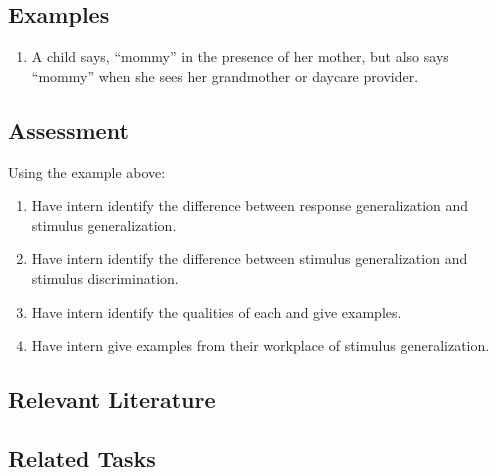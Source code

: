 \subsection{Examples}
\begin{enumerate}
\item  A child says, ``mommy'' in the presence of her mother, but also says ``mommy'' when she sees her grandmother or daycare provider.
%
\end{enumerate}
%
\subsection{Assessment}
Using the example above:
\begin{enumerate}
\item Have intern identify the difference between response generalization and stimulus generalization.
\item Have intern identify the difference between stimulus generalization and stimulus discrimination. 
\item Have intern identify the qualities of each and give examples.
\item Have intern give examples from their workplace of stimulus generalization.
\end{enumerate}
%
\subsection{Relevant Literature}
\begin{refsection}
\nocite{test,alang2017police,clayton2018black}
\printbibliography[heading=none]
\end{refsection}
%
\subsection{Related Tasks}
\fourbOne{}\\
\foureSix{}\\
\fourjEleven{}\\
\fourjFourteen{}\\
\fourFKTen{}\\
\fourFKEleven{}\\
\fourFKTwelve{}\\
\fourFKThirtySix{}\\
%
%
%
%
%
%
